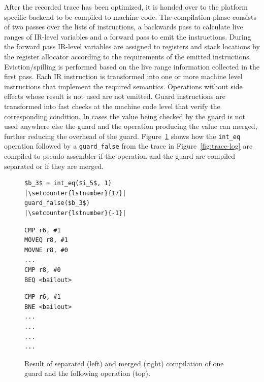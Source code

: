 \documentclass[letter,10pt]{sigplanconf}
\let\oldlstinline=\lstinline
\renewcommand\lstinline[1]{\oldlstinline[basicstyle=\ttfamily]{#1}}
\begin{document}
After the recorded trace has been optimized, it is handed over to the platform specific
backend to be compiled to machine code. The compilation phase consists of two
passes over the lists of instructions, a backwards pass to calculate live
ranges of IR-level variables and a forward pass to emit the instructions. During
the forward pass IR-level variables are assigned to registers and stack
locations by the register allocator according to the requirements of the
emitted instructions.  Eviction/spilling is performed based on the live range
information collected in the first pass. Each IR instruction is transformed
into one or more machine level instructions that implement the required
semantics. Operations without side effects whose result is not used are not
emitted. Guard instructions are transformed into fast checks at the machine
code level that verify the corresponding condition.  In cases the value being
checked by the guard is not used anywhere else the guard and the operation
producing the value can merged, further reducing the overhead of the guard.
Figure~\ref{fig:trace-compiled} shows how the \lstinline{int_eq} operation
followed by a \lstinline{guard_false} from the trace in Figure~\ref{fig:trace-log} are compiled to
pseudo-assembler if the operation and the guard are compiled separated or if
they are merged.

\begin{figure}[ht]
  \noindent
  \centering
  \begin{minipage}{1\columnwidth}
\begin{lstlisting}[xleftmargin=20pt,xrightmargin=20pt,framexleftmargin=5pt,framexrightmargin=-10pt,mathescape, numbers=right, escapechar=|, firstnumber=18,frame=b]
$b_3$ = int_eq($i_5$, 1)                    |\setcounter{lstnumber}{17}|
guard_false($b_3$)                          |\setcounter{lstnumber}{-1}|
\end{lstlisting}
  \end{minipage}
  \begin{minipage}{.40\columnwidth}
    \begin{lstlisting}
CMP r6, #1
MOVEQ r8, #1
MOVNE r8, #0
...
CMP r8, #0
BEQ <bailout>
    \end{lstlisting}
  \end{minipage}
  \hfill
  \begin{minipage}{.40\columnwidth}
    \begin{lstlisting}
CMP r6, #1
BNE <bailout>
...
...
...
...
    \end{lstlisting}
  \end{minipage}
  \caption{Result of separated (left) and merged (right) compilation of one guard and the following operation (top).}
  \label{fig:trace-compiled}
\end{figure}
\end{document}
